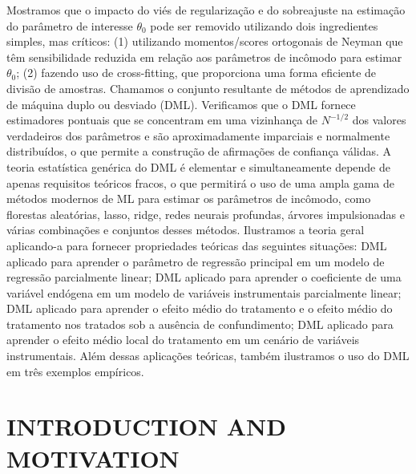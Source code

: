 \documentclass[a4paper,12pt]{article}[abntex2]
\begin{document}
Mostramos que o impacto do viés de regularização e do sobreajuste na estimação do parâmetro de interesse $\theta_0$ pode ser removido utilizando dois ingredientes simples, mas críticos: (1) utilizando momentos/scores ortogonais de Neyman que têm sensibilidade reduzida em relação aos parâmetros de incômodo para estimar $\theta_0$; (2) fazendo uso de cross-fitting, que proporciona uma forma eficiente de divisão de amostras. Chamamos o conjunto resultante de métodos de aprendizado de máquina duplo ou desviado (DML). Verificamos que o DML fornece estimadores pontuais que se concentram em uma vizinhança de $N^{-1/2}$ dos valores verdadeiros dos parâmetros e são aproximadamente imparciais e normalmente distribuídos, o que permite a construção de afirmações de confiança válidas. A teoria estatística genérica do DML é elementar e simultaneamente depende de apenas requisitos teóricos fracos, o que permitirá o uso de uma ampla gama de métodos modernos de ML para estimar os parâmetros de incômodo, como florestas aleatórias, lasso, ridge, redes neurais profundas, árvores impulsionadas e várias combinações e conjuntos desses métodos. Ilustramos a teoria geral aplicando-a para fornecer propriedades teóricas das seguintes situações: DML aplicado para aprender o parâmetro de regressão principal em um modelo de regressão parcialmente linear; DML aplicado para aprender o coeficiente de uma variável endógena em um modelo de variáveis instrumentais parcialmente linear; DML aplicado para aprender o efeito médio do tratamento e o efeito médio do tratamento nos tratados sob a ausência de confundimento; DML aplicado para aprender o efeito médio local do tratamento em um cenário de variáveis instrumentais. Além dessas aplicações teóricas, também ilustramos o uso do DML em três exemplos empíricos.

\newpage

\section{INTRODUCTION  AND  MOTIVATION}
\end{document}
